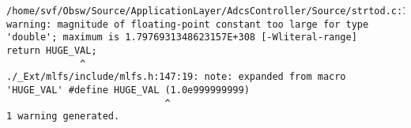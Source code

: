 
\noindent\begin{minipage}{\textwidth}
\begin{lstlisting}[language={}, caption=2nd warning example., label=srciror_2]
/home/svf/Obsw/Source/ApplicationLayer/AdcsController/Source/strtod.c:122:12: warning: magnitude of floating-point constant too large for type 'double'; maximum is 1.7976931348623157E+308 [-Wliteral-range]
return HUGE_VAL; 
			 ^
./_Ext/mlfs/include/mlfs.h:147:19: note: expanded from macro 'HUGE_VAL' #define HUGE_VAL (1.0e999999999)
							^ 
1 warning generated.
\end{lstlisting}
\end{minipage}